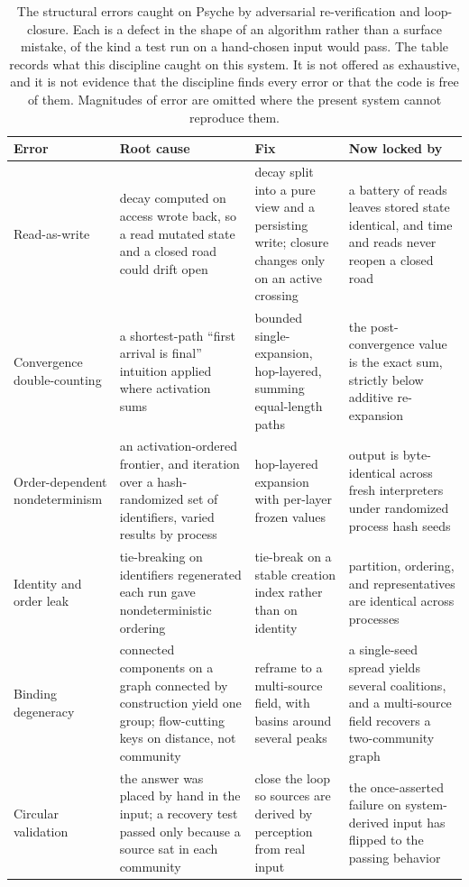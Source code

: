 \documentclass[11pt]{article}
\begin{document}
\begin{table}[t]
  \centering
  \caption{The structural errors caught on Psyche by adversarial re-verification and
    loop-closure. Each is a defect in the shape of an algorithm rather than a surface
    mistake, of the kind a test run on a hand-chosen input would pass. The table records
    what this discipline caught on this system. It is not offered as exhaustive, and it
    is not evidence that the discipline finds every error or that the code is free of
    them. Magnitudes of error are omitted where the present system cannot reproduce
    them.}
  \label{tab:bugs}
  \footnotesize
  \setlength{\tabcolsep}{4pt}
  \begin{tabular}{@{}p{1.9cm}p{3.7cm}p{3.5cm}p{4.5cm}@{}}
    \toprule
    Error & Root cause & Fix & Now locked by \\
    \midrule
    Read-as-write & decay computed on access wrote back, so a read mutated state and a closed road could drift open & decay split into a pure view and a persisting write; closure changes only on an active crossing & a battery of reads leaves stored state identical, and time and reads never reopen a closed road \\
    \addlinespace
    Convergence double-counting & a shortest-path ``first arrival is final'' intuition applied where activation sums & bounded single-expansion, hop-layered, summing equal-length paths & the post-convergence value is the exact sum, strictly below additive re-expansion \\
    \addlinespace
    Order-dependent nondeterminism & an activation-ordered frontier, and iteration over a hash-randomized set of identifiers, varied results by process & hop-layered expansion with per-layer frozen values & output is byte-identical across fresh interpreters under randomized process hash seeds \\
    \addlinespace
    Identity and order leak & tie-breaking on identifiers regenerated each run gave nondeterministic ordering & tie-break on a stable creation index rather than on identity & partition, ordering, and representatives are identical across processes \\
    \addlinespace
    Binding degeneracy & connected components on a graph connected by construction yield one group; flow-cutting keys on distance, not community & reframe to a multi-source field, with basins around several peaks & a single-seed spread yields several coalitions, and a multi-source field recovers a two-community graph \\
    \addlinespace
    Circular validation & the answer was placed by hand in the input; a recovery test passed only because a source sat in each community & close the loop so sources are derived by perception from real input & the once-asserted failure on system-derived input has flipped to the passing behavior \\
    \bottomrule
  \end{tabular}
\end{table}
\end{document}
